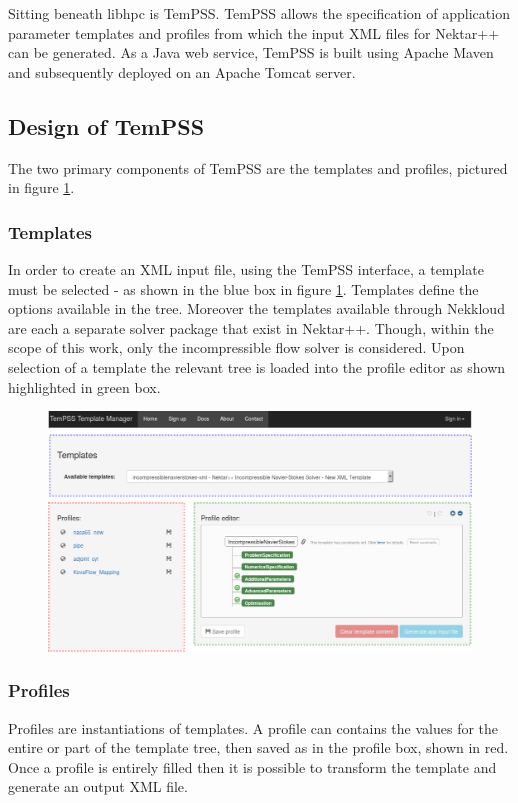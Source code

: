 \documentclass[11pt, a4paper]{report}
\begin{document}
Sitting beneath libhpc is TemPSS. TemPSS allows the specification of application parameter templates and profiles from which the input XML files for Nektar++ can be generated. As a Java web service, TemPSS is built using Apache Maven and subsequently deployed on an Apache Tomcat server.

\subsection{Design of TemPSS}
The two primary components of TemPSS are the templates and profiles, pictured in figure \ref{fig:TemPSS_interface}.

\subsubsection{Templates}
In order to create an XML input file, using the TemPSS interface, a template must be selected - as shown in the \textcolor{myblue}{blue box} in figure \ref{fig:TemPSS_interface}. Templates define the options available in the tree. Moreover the templates available through Nekkloud are each a separate solver package that exist in Nektar++. Though, within the scope of this work, only the incompressible flow solver is considered. Upon selection of a template the relevant tree is loaded into the profile editor as shown highlighted in \textcolor{mygreen}{green box}. 

\begin{figure}[htb!]
 \centering
 \includegraphics[width=.85\linewidth,  clip=true, trim = 0cm 0cm 0cm 0cm]{TemPSS_interface}
 \label{fig:TemPSS_interface}
\end{figure}

\subsubsection{Profiles}
Profiles are instantiations of templates. A profile can contains the values for the entire or part of the template tree, then saved as in the profile box, shown in \textcolor{myred}{red}. Once a profile is entirely filled then it is possible to transform the template and generate an output XML file.
\end{document}
